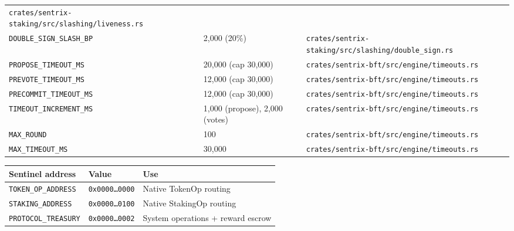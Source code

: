 \documentclass[11pt,a4paper]{article}
\begin{document}
\begin{longtable}[]{@{}lll@{}}
\texttt{crates/sentrix-staking/src/slashing/liveness.rs} \\
\texttt{DOUBLE\_SIGN\_SLASH\_BP} & 2,000 (20\%) &
\texttt{crates/sentrix-staking/src/slashing/double\_sign.rs} \\
\texttt{PROPOSE\_TIMEOUT\_MS} & 20,000 (cap 30,000) &
\texttt{crates/sentrix-bft/src/engine/timeouts.rs} \\
\texttt{PREVOTE\_TIMEOUT\_MS} & 12,000 (cap 30,000) &
\texttt{crates/sentrix-bft/src/engine/timeouts.rs} \\
\texttt{PRECOMMIT\_TIMEOUT\_MS} & 12,000 (cap 30,000) &
\texttt{crates/sentrix-bft/src/engine/timeouts.rs} \\
\texttt{TIMEOUT\_INCREMENT\_MS} & 1,000 (propose), 2,000 (votes) &
\texttt{crates/sentrix-bft/src/engine/timeouts.rs} \\
\texttt{MAX\_ROUND} & 100 &
\texttt{crates/sentrix-bft/src/engine/timeouts.rs} \\
\texttt{MAX\_TIMEOUT\_MS} & 30,000 &
\texttt{crates/sentrix-bft/src/engine/timeouts.rs} \\
\end{longtable}

\begin{longtable}[]{@{}lll@{}}
\toprule\noalign{}
Sentinel address & Value & Use \\
\midrule\noalign{}
\endhead
\bottomrule\noalign{}
\endlastfoot
\texttt{TOKEN\_OP\_ADDRESS} & \texttt{0x0000…0000} & Native TokenOp
routing \\
\texttt{STAKING\_ADDRESS} & \texttt{0x0000…0100} & Native StakingOp
routing \\
\texttt{PROTOCOL\_TREASURY} & \texttt{0x0000…0002} & System operations +
reward escrow \\
\end{longtable}
\end{document}
